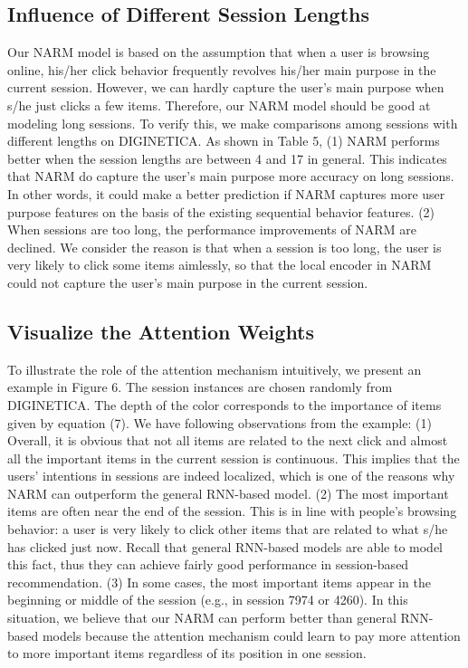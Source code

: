 \documentclass[sigconf]{acmart}
\begin{document}
\subsection{Influence of Different Session Lengths}
Our NARM model is based on the assumption that when a user is browsing online, his/her click behavior frequently revolves his/her main purpose in the current session. However, we can hardly capture the user's main purpose when s/he just clicks a few items. Therefore, our NARM model should be good at modeling long sessions. To verify this, we make comparisons among sessions with different lengths on DIGINETICA. As shown in Table 5, (1) NARM performs better when the session lengths are between 4 and 17 in general. This indicates that NARM do capture the user's main purpose more accuracy on long sessions. In other words, it could make a better prediction if NARM captures more user purpose features on the basis of the existing sequential behavior features. (2) When sessions are too long, the performance improvements of NARM are declined. We consider the reason is that when a session is too long, the user is very likely to click some items aimlessly, so that the local encoder in NARM could not capture the user's main purpose in the current session.

\subsection{Visualize the Attention Weights}
To illustrate the role of the attention mechanism intuitively, we present an example in Figure 6. The session instances are chosen randomly from DIGINETICA. The depth of the color corresponds to the importance of items given by equation (7). We have following observations from the example: (1) Overall, it is obvious that not all items are related to the next click and almost all the important items in the current session is continuous. This implies that the users' intentions in sessions are indeed localized, which is one of the reasons why NARM can outperform the general RNN-based model. (2) The most important items are often near the end of the session. This is in line with people's browsing behavior: a user is very likely to click other items that are related to what s/he has clicked just now. Recall that general RNN-based models are able to model this fact, thus they can achieve fairly good performance in session-based recommendation. (3) In some cases, the most important items appear in the beginning or middle of the session (e.g., in session 7974 or 4260). In this situation, we believe that our NARM can perform better than general RNN-based models because the attention mechanism could learn to pay more attention to more important items regardless of its position in one session. 
\end{document}
